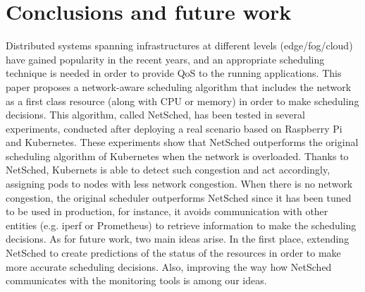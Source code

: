 \documentclass[conference]{IEEEtran}
\begin{document}
\section{Conclusions and future work}\label{sec:conc}

Distributed systems spanning infrastructures at different levels (edge/fog/cloud) have gained popularity in the recent years, and an appropriate scheduling technique is needed in order to provide QoS to the running applications. This paper proposes a network-aware scheduling  algorithm that includes the network as a first class resource (along with CPU or memory) in order to make scheduling decisions. This algorithm, called NetSched, has been tested in several experiments, conducted after deploying a real scenario based on Raspberry Pi and Kubernetes. These experiments show that NetSched outperforms the original scheduling algorithm of Kubernetes when the network is overloaded. Thanks to NetSched, Kubernets is able to detect such congestion and act accordingly, assigning pods to nodes with less network congestion. 
When there is no network congestion, the original scheduler outperforms NetSched since it  has been tuned to be used in production, for instance, it avoids communication with other entities (e.g. iperf  or Prometheus) to retrieve information to make the scheduling decisions. 
As for future work, two main ideas arise. In the first place, extending NetSched to create predictions of the status of the resources in order to make more accurate scheduling decisions. Also, improving the way how NetSched communicates with the monitoring tools is among our ideas.
 
\end{document}
